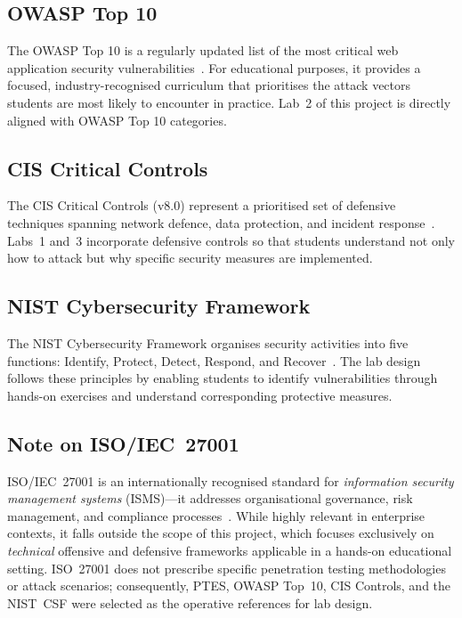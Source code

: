 \subsection{OWASP Top 10}

The OWASP Top 10 is a regularly updated list of the most critical web application security
vulnerabilities~\cite{owasp2021}. For educational purposes, it provides a focused, industry-recognised
curriculum that prioritises the attack vectors students are most likely to encounter in practice.
Lab~2 of this project is directly aligned with OWASP Top 10 categories.

\subsection{CIS Critical Controls}

The CIS Critical Controls (v8.0) represent a prioritised set of defensive techniques spanning
network defence, data protection, and incident response~\cite{cis_controls}. Labs~1 and~3
incorporate defensive controls so that students understand not only how to attack but why
specific security measures are implemented.

\subsection{NIST Cybersecurity Framework}

The NIST Cybersecurity Framework organises security activities into five functions: Identify,
Protect, Detect, Respond, and Recover~\cite{nist_framework}. The lab design follows these
principles by enabling students to identify vulnerabilities through hands-on exercises and
understand corresponding protective measures.

\subsection*{Note on ISO/IEC~27001}

ISO/IEC~27001 is an internationally recognised standard for
\textit{information security management systems} (ISMS)---it addresses
organisational governance, risk management, and compliance
processes~\cite{iso27001}. While highly relevant in enterprise contexts,
it falls outside the scope of this project, which focuses exclusively on
\textit{technical} offensive and defensive frameworks applicable in a
hands-on educational setting. ISO~27001 does not prescribe specific
penetration testing methodologies or attack scenarios; consequently,
PTES, OWASP Top~10, CIS Controls, and the NIST~CSF were selected as the
operative references for lab design.




